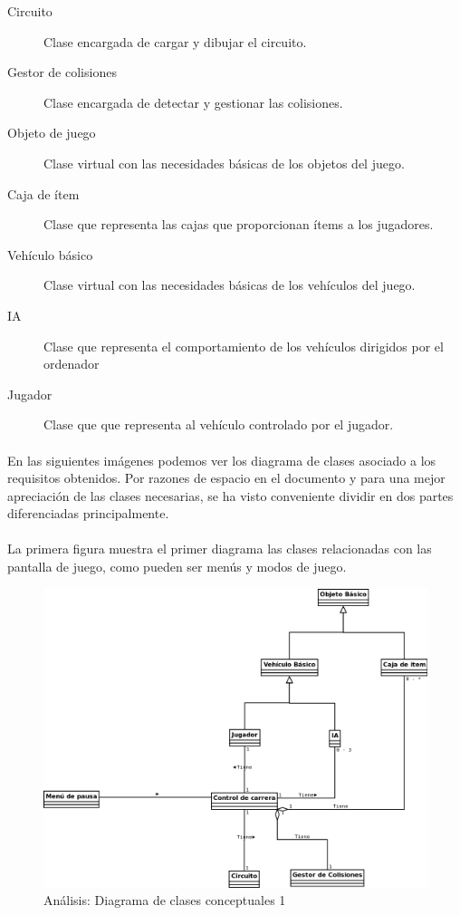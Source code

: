 \begin{description}
    \item [Circuito] Clase encargada de cargar y dibujar el circuito.
    \item [Gestor de colisiones] Clase encargada de detectar y gestionar las colisiones.
    
    \item [Objeto de juego] Clase virtual con las necesidades básicas de los objetos del juego.
    \item [Caja de ítem] Clase que representa las cajas que proporcionan ítems a los jugadores.
    \item [Vehículo básico] Clase virtual con las necesidades básicas de los vehículos del juego.
    \item [IA] Clase que representa el comportamiento de los vehículos dirigidos por el ordenador
    \item [Jugador] Clase que que representa al vehículo controlado por el jugador.
\end{description}

\paragraph{}
En las siguientes imágenes podemos ver los diagrama de clases asociado a los requisitos obtenidos. Por razones de espacio en el
documento y para una mejor apreciación de las clases necesarias, se ha visto conveniente dividir en dos partes diferenciadas
principalmente.

\paragraph{}
La primera figura muestra el primer diagrama las clases relacionadas con las pantalla de juego, como pueden ser menús y 
modos de juego.

\begin{figure}[H]
  \label{diagrama_clases_conceptuales}
  \begin{center}
    \includegraphics[scale=0.45]{imagenes/analisis/diagrama_clases_conceptuales2.png}
  \end{center}
  \caption{Análisis: Diagrama de clases conceptuales 1}
\end{figure}

